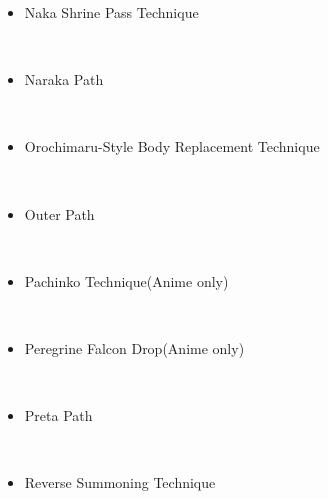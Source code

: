 \documentclass[a4paper,12pt]{article}
\begin{document}
\begin{itemize}
\item Naka Shrine Pass Technique
\end{itemize}\\ \par \vspace{0.5cm}

\begin{itemize}
\item Naraka Path
\end{itemize}\\ \par \vspace{0.5cm}

\begin{itemize}
\item Orochimaru-Style Body Replacement Technique
\end{itemize}\\ \par \vspace{0.5cm}

\begin{itemize}
\item Outer Path
\end{itemize}\\ \par \vspace{0.5cm}

\begin{itemize}
\item Pachinko Technique(Anime only)
\end{itemize}\\ \par \vspace{0.5cm}

\begin{itemize}
\item Peregrine Falcon Drop(Anime only)
\end{itemize}\\ \par \vspace{0.5cm}

\begin{itemize}
\item Preta Path
\end{itemize}\\ \par \vspace{0.5cm}

\begin{itemize}
\item Reverse Summoning Technique
\end{itemize}\\ \par \vspace{0.5cm}
\end{document}
